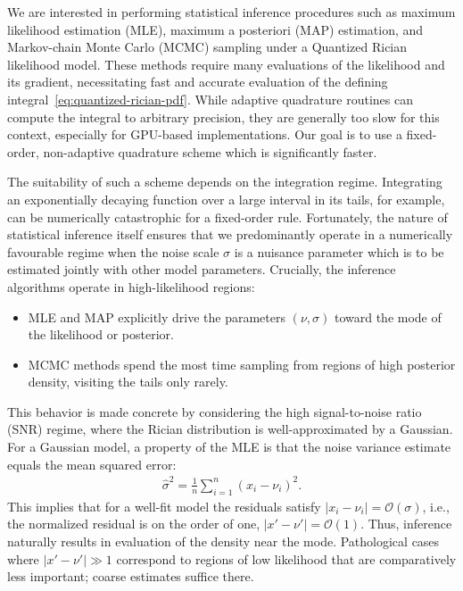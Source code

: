 \documentclass{article}
\begin{document}
We are interested in performing statistical inference procedures such as maximum likelihood estimation (MLE), maximum a posteriori (MAP) estimation, and Markov-chain Monte Carlo (MCMC) sampling under a Quantized Rician likelihood model.
These methods require many evaluations of the likelihood and its gradient, necessitating fast and accurate evaluation of the defining integral~\eqref{eq:quantized-rician-pdf}.
While adaptive quadrature routines can compute the integral to arbitrary precision, they are generally too slow for this context, especially for GPU-based implementations.
Our goal is to use a fixed-order, non-adaptive quadrature scheme which is significantly faster.

The suitability of such a scheme depends on the integration regime.
Integrating an exponentially decaying function over a large interval in its tails, for example, can be numerically catastrophic for a fixed-order rule.
Fortunately, the nature of statistical inference itself ensures that we predominantly operate in a numerically favourable regime when the noise scale $\sigma$ is a nuisance parameter which is to be estimated jointly with other model parameters.
Crucially, the inference algorithms operate in high-likelihood regions:
%
\begin{itemize}
  \item MLE and MAP explicitly drive the parameters $(\nu,\sigma)$ toward the mode of the likelihood or posterior.
  \item MCMC methods spend the most time sampling from regions of high posterior density, visiting the tails only rarely.
\end{itemize}
%
This behavior is made concrete by considering the high signal-to-noise ratio (SNR) regime, where the Rician distribution is well-approximated by a Gaussian.
For a Gaussian model, a property of the MLE is that the noise variance estimate equals the mean squared error:
%
\begin{align}
  \hat{\sigma}^2 = \frac{1}{n} \sum_{i=1}^n (x_i - \nu_i)^2.
\end{align}
%
This implies that for a well-fit model the residuals satisfy $|x_i - \nu_i| = \mathcal{O}(\sigma)$, i.e., the normalized residual is on the order of one, $|x' - \nu'| = \mathcal{O}(1)$.
Thus, inference naturally results in evaluation of the density near the mode.
Pathological cases where $|x'-\nu'| \gg 1$ correspond to regions of low likelihood that are comparatively less important;
coarse estimates suffice there.
\end{document}
